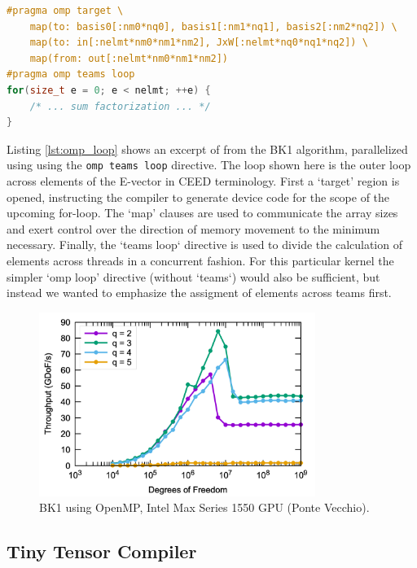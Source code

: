 \documentclass[a4paper,12pt]{article}
\begin{document}
\begin{lstlisting}[language=C++,caption={The `omp teams loop' directive},
                   label={lst:omp_loop},basicstyle=\ttfamily\footnotesize]
#pragma omp target \
    map(to: basis0[:nm0*nq0], basis1[:nm1*nq1], basis2[:nm2*nq2]) \
    map(to: in[:nelmt*nm0*nm1*nm2], JxW[:nelmt*nq0*nq1*nq2]) \
    map(from: out[:nelmt*nm0*nm1*nm2])
#pragma omp teams loop
for(size_t e = 0; e < nelmt; ++e) {
    /* ... sum factorization ... */
}
\end{lstlisting}

Listing \ref{lst:omp_loop} shows an excerpt of from the BK1 algorithm, parallelized using using the \texttt{omp teams loop} directive. 
The loop shown here is the outer loop across elements of the E-vector in CEED terminology.
First a `target' region is opened, instructing the compiler to generate
device code for the scope of the upcoming for-loop. 
The `map' clauses are used to communicate the array sizes and exert control over the direction of memory movement to the minimum necessary.
Finally, the `teams loop` directive is used to divide the calculation of elements across threads in a concurrent fashion.
For this particular kernel the simpler `omp loop' directive (without `teams`) would also be sufficient, but instead we wanted to emphasize the assigment of elements across teams first.

\begin{figure}[htbp]
  \centering
  \includegraphics[width=0.8\textwidth]{pvc_openmp} %
  \caption{BK1 using OpenMP, Intel Max Series 1550 GPU (Ponte Vecchio).}
  \label{fig:pvc_openmp}
\end{figure}


\subsection{Tiny Tensor Compiler}
\end{document}
